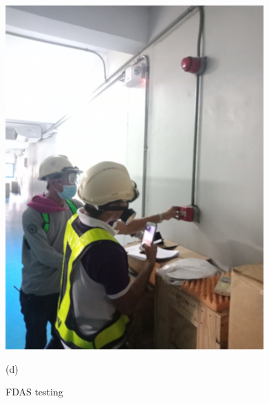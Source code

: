 \begin{figure}[h]
\begin{minipage}[b]{0.22\linewidth}
		\includegraphics[width=\textwidth]{figures/ch02_fdas04}
		\caption*{(d)}
	\end{minipage}
	\caption{FDAS testing}
	\label{ch02_fdas}
\end{figure}
